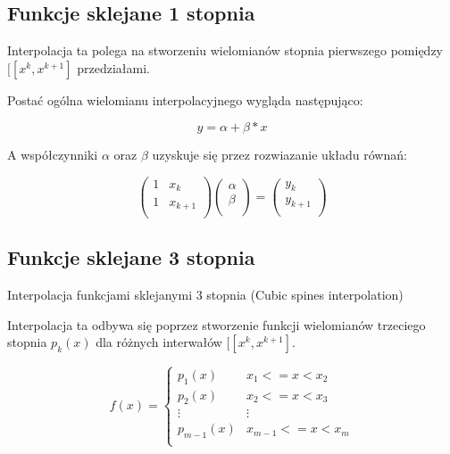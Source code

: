 \documentclass[varwidth,12pt,a4paper]{article}
\begin{document}


\subsection{Funkcje sklejane 1 stopnia}

Interpolacja ta polega na stworzeniu wielomianów stopnia pierwszego pomiędzy $ [[x^k, x^{k+1}] $ przedziałami.

Postać ogólna wielomianu interpolacyjnego wygląda następująco:

\begin{equation}
    y = \alpha + \beta * x
\end{equation}

A współczynniki $\alpha$ oraz $\beta$ uzyskuje się przez rozwiazanie układu równań:

$$
\left( \begin{array}{cc}
    1 & x_k \\
    1 & x_{k + 1} \\
\end{array} \right) \left( \begin{array}{c}
\alpha\\
\beta \\
\end{array} \right) = \left( \begin{array}{c}
    y_k \\
    y_{k + 1} \\
\end{array} \right) 
$$



\subsection{Funkcje sklejane 3 stopnia}

Interpolacja funkcjami sklejanymi 3 stopnia (Cubic spines interpolation)

Interpolacja ta odbywa się poprzez stworzenie funkcji wielomianów trzeciego stopnia $ p_k(x) $
dla różnych interwałów $ [[x^k, x^{k+1}] $.

$$
    f(x) = \left\{ \begin{array}{ll}
    p_1 (x) & \textrm{$x_1 <= x < x_2$}\\
    p_2 (x) & \textrm{$x_2 <= x < x_3$}\\
    \vdots  & \vdots \\
    p_{m-1} (x) & \textrm{$x_{m-1} <= x < x_m$}\\
    \end{array} \right.
$$
\end{document}
